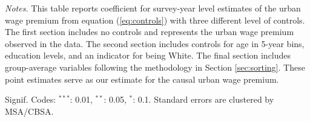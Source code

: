 \documentclass[12pt]{article}
\begin{document}
\begin{table}[!p]
{\begin{threeparttable}
\begin{tabular}{@{} l *{8}{c} @{}}
      \bottomrule
    \end{tabular}
        
    \begin{tablenotes}[flushleft]\footnotesize
        \item\textit{Notes.} This table reports coefficient for survey-year level estimates of the urban wage premium from equation (\ref{eq:controls}) with three different level of controls.
The first section includes no controls and represents the urban wage premium observed in the data.
The second section includes controls for age in 5-year bins, education levels, and an indicator for being White.
The final section includes group-average variables following the methodology in Section \ref{sec:sorting}.
These point estimates serve as our estimate for the causal urban wage premium.
        
        \item Signif.
Codes: $^{***}$: 0.01, $^{**}$: 0.05, $^{*}$: 0.1.
Standard errors are clustered  by MSA/CBSA.
    \end{tablenotes}
  \end{threeparttable}
  }

\end{table}

\newpage\clearpage



\end{document}
